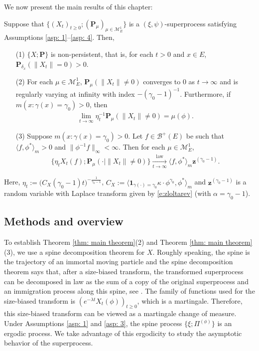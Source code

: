 	We now present the main results of this chapter:

\begin{thm} \label{thm: main theorem}
	Suppose that $\{(X_t)_{t\geq 0}; (\mathbf P_\mu)_{\mu \in \mathcal M_E^1}\}$ is a $(\xi, \psi)$-superprocess satisfying Assumptions \ref{asp: 1}--\ref{asp: 4}.
	Then,
\begin{itemize}
\item[(1)]
	$\{X; \mathbf P\}$ is non-persistent, that is, for each $t > 0$ and $x\in E$,
	$\mathbf P_{\delta_x}( \| X_t\| = 0) > 0$.
\item[(2)]
	For each $\mu \in \mathcal M^1_E$, $\mathbf P_{\mu}(\|X_t\| \neq 0)$ converges to
	$0$ as $t \to \infty$ and is regularly varying at infinity with index $-(\gamma_0-1)^{-1}$.
	Furthermore, if $m(x: \gamma (x)= \gamma_0)>0$, then
\begin{align}
	\lim_{t\to\infty} \eta_t^{-1}\mathbf P_{\mu}(\|X_t\| \neq 0)
	=\mu(\phi).
\end{align}
\item[(3)]
	Suppose $m( x:\gamma(x)=\gamma_0 )>0$.
	Let $f \in \mathscr B^+(E)$ be such that $\langle f, \phi^* \rangle_m > 0$ and $\| \phi^{-1}f \|_\infty < \infty$. Then for each $\mu \in \mathcal M_E^1$,
\begin{align}
	\{\eta_t X_t(f) ; \mathbf P_{\mu}(\cdot |\|X_t\| \neq 0) \}
	\xrightarrow[t\to \infty]{\operatorname{law}} \langle f, \phi^*\rangle_m \mathbf z^{(\gamma_0 - 1)}.
\end{align}
\end{itemize}
	Here, $\eta_t := \big( C_X(\gamma_0 - 1) t \big)^{- \frac {1} {\gamma_0 - 1} }$, $C_X := \langle \mathbf 1_{\gamma(\cdot) = \gamma_0} \kappa\cdot \phi^{\gamma_0}, \phi^* \rangle_m$ 
	and $\mathbf z^{(\gamma_0 - 1)}$ is a random variable with Laplace transform given by \eqref{e:zloltarev} 
	(with $\alpha=\gamma_0 -1$).

\end{thm}

\subsection{Methods and overview}
	
	To establish Theorem \ref{thm: main theorem}(2) and Theorem \ref{thm: main theorem}(3), we use a spine decomposition theorem for 	$X$.
	Roughly speaking, the spine is the trajectory of an immortal moving particle and the spine decomposition theorem says that, after a size-biased transform, the transformed superprocess can be decomposed in law as the sum of a copy of the original superprocess and an immigration process along this spine, see \cite{EckhoffKyprianouWinkel2015Spines, EnglanderKyprianou2004Local, LiuRenSong2009Llog}.
	The family of functions used for the size-biased transform is $(e^{-\lambda t} X_t(\phi))_{t\geq 0}$, which is a martingale.
	Therefore, this size-biased transform can be viewed as a martingale change of measure.
	Under Assumptions \ref{asp: 1} and \ref{asp: 3}, the spine process $\{\xi; \Pi^{(\phi)}\}$ is an ergodic process.
	We take advantage of this ergodicity to study the asymptotic behavior of the superprocess.
	
